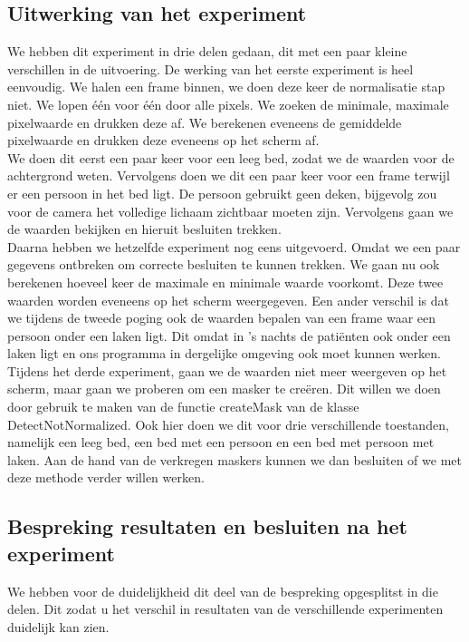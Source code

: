  \subsection{Uitwerking van het experiment}
 \label{ERefPZNV}
We hebben dit experiment in drie delen gedaan, dit met een paar kleine verschillen in de uitvoering.
De werking van het eerste experiment is heel eenvoudig. We halen een frame binnen, we doen deze keer de normalisatie stap niet. We lopen \'e\'en voor \'e\'en door alle pixels. We zoeken de minimale, maximale pixelwaarde en drukken deze af. We berekenen eveneens de gemiddelde pixelwaarde en drukken deze eveneens op het scherm af. \\
We doen dit eerst een paar keer voor een leeg bed, zodat we de waarden voor de achtergrond weten. Vervolgens doen we dit een paar keer voor een frame terwijl er een persoon in het bed ligt. De persoon gebruikt geen deken, bijgevolg zou voor de camera het volledige lichaam zichtbaar moeten zijn.  Vervolgens gaan we de waarden bekijken en hieruit besluiten trekken. \\
Daarna hebben we hetzelfde experiment nog eens uitgevoerd. Omdat we een paar gegevens ontbreken om correcte besluiten te kunnen trekken. We gaan nu ook berekenen hoeveel keer de maximale en minimale waarde voorkomt. Deze twee waarden worden eveneens op het scherm weergegeven. Een ander verschil is dat we tijdens de tweede poging ook de waarden bepalen van een frame waar een persoon onder een laken ligt. Dit omdat in 's nachts de pati\"enten ook onder een laken ligt en ons programma in dergelijke omgeving ook moet kunnen werken. \\
Tijdens het derde experiment, gaan we de waarden niet meer weergeven op het scherm, maar gaan we proberen om een masker te cre\"eren. Dit willen we doen door gebruik te maken van de functie createMask van de klasse DetectNotNormalized. Ook hier doen we dit voor drie verschillende toestanden, namelijk een leeg bed, een bed met een persoon en een bed met persoon met laken. Aan de hand van de verkregen maskers kunnen we dan besluiten of we met deze methode verder willen werken.
 
 
 \subsection{Bespreking resultaten en besluiten na het experiment}
 \label{ERefPZNB}
 We hebben voor de duidelijkheid dit deel van de bespreking opgesplitst in die delen. Dit zodat u het verschil in resultaten van de verschillende experimenten duidelijk kan zien. 
 
